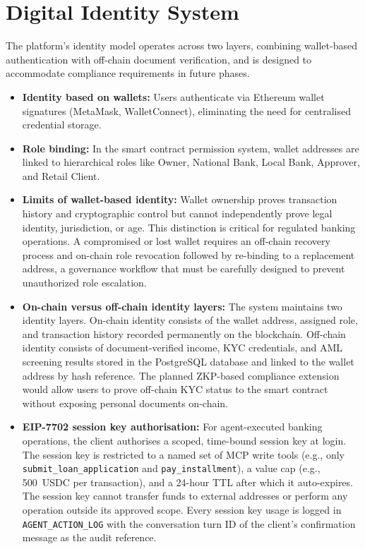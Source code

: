 \documentclass[12pt,a4paper]{report}
\begin{document}
\section{Digital Identity System}

The platform's identity model operates across two layers, combining wallet-based authentication with off-chain document verification, and is designed to accommodate compliance requirements in future phases.

\begin{itemize}[noitemsep]
\item \textbf{Identity based on wallets:} Users authenticate via Ethereum wallet signatures (MetaMask, WalletConnect), eliminating the need for centralised credential storage.
\item \textbf{Role binding:} In the smart contract permission system, wallet addresses are linked to hierarchical roles like Owner, National Bank, Local Bank, Approver, and Retail Client.
\item \textbf{Limits of wallet-based identity:} Wallet ownership proves transaction history and cryptographic control but cannot independently prove legal identity, jurisdiction, or age. This distinction is critical for regulated banking operations. A compromised or lost wallet requires an off-chain recovery process and on-chain role revocation followed by re-binding to a replacement address, a governance workflow that must be carefully designed to prevent unauthorized role escalation.
\item \textbf{On-chain versus off-chain identity layers:} The system maintains two identity layers. On-chain identity consists of the wallet address, assigned role, and transaction history recorded permanently on the blockchain. Off-chain identity consists of document-verified income, KYC credentials, and AML screening results stored in the PostgreSQL database and linked to the wallet address by hash reference. The planned ZKP-based compliance extension would allow users to prove off-chain KYC status to the smart contract without exposing personal documents on-chain.
\item \textbf{EIP-7702 session key authorisation:} For agent-executed banking operations, the client authorises a scoped, time-bound session key at login. The session key is restricted to a named set of MCP write tools (e.g., only \texttt{submit\_loan\_application} and \texttt{pay\_installment}), a value cap (e.g., 500~USDC per transaction), and a 24-hour TTL after which it auto-expires. The session key cannot transfer funds to external addresses or perform any operation outside its approved scope. Every session key usage is logged in \texttt{AGENT\_ACTION\_LOG} with the conversation turn ID of the client's confirmation message as the audit reference.
\end{itemize}
\end{document}
